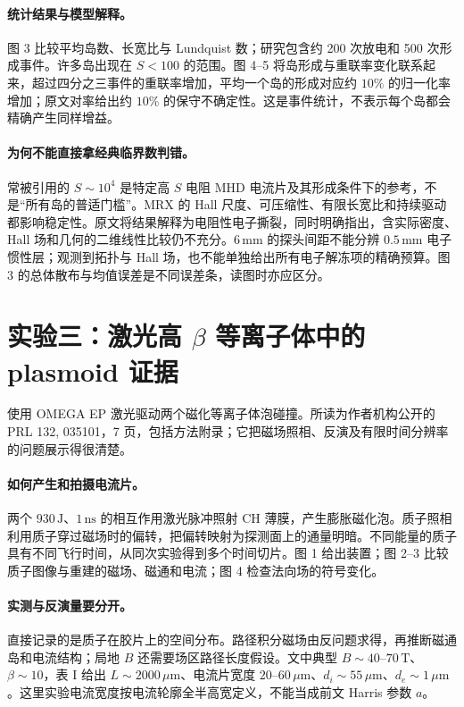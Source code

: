 \paragraph{统计结果与模型解释。}
图 3 比较平均岛数、长宽比与 Lundquist 数；研究包含约 200 次放电和 500 次形成事件。许多岛出现在 $S<100$ 的范围。图 4--5 将岛形成与重联率变化联系起来，超过四分之三事件的重联率增加，平均一个岛的形成对应约 $10\%$ 的归一化率增加；原文对率给出约 $10\%$ 的保守不确定性。这是事件统计，不表示每个岛都会精确产生同样增益。\citep{TMJaraAlmonte2016}

\paragraph{为何不能直接拿经典临界数判错。}
常被引用的 $S\sim10^4$ 是特定高 $S$ 电阻 MHD 电流片及其形成条件下的参考，不是“所有岛的普适门槛”。MRX 的 Hall 尺度、可压缩性、有限长宽比和持续驱动都影响稳定性。原文将结果解释为电阻性电子撕裂，同时明确指出，含实际密度、Hall 场和几何的二维线性比较仍不充分。$6\,\mathrm{mm}$ 的探头间距不能分辨 $0.5\,\mathrm{mm}$ 电子惯性层；观测到拓扑与 Hall 场，也不能单独给出所有电子解冻项的精确预算。图 3 的总体散布与均值误差是不同误差条，读图时亦应区分。\citep{TMJaraAlmonte2016}

\section{实验三：激光高 \texorpdfstring{$\beta$}{beta} 等离子体中的 plasmoid 证据}
\label{tm:sec:laser}

\citet{TMPearcy2024} 使用 OMEGA EP 激光驱动两个磁化等离子体泡碰撞。所读为作者机构公开的 PRL 132, 035101，7 页，包括方法附录；它把磁场照相、反演及有限时间分辨率的问题展示得很清楚。

\paragraph{如何产生和拍摄电流片。}
两个 $930\,\mathrm J$、$1\,\mathrm{ns}$ 的相互作用激光脉冲照射 CH 薄膜，产生膨胀磁化泡。质子照相利用质子穿过磁场时的偏转，把偏转映射为探测面上的通量明暗。不同能量的质子具有不同飞行时间，从同次实验得到多个时间切片。图 1 给出装置；图 2--3 比较质子图像与重建的磁场、磁通和电流；图 4 检查法向场的符号变化。

\paragraph{实测与反演量要分开。}
直接记录的是质子在胶片上的空间分布。路径积分磁场由反问题求得，再推断磁通岛和电流结构；局地 $B$ 还需要场区路径长度假设。文中典型 $B\sim40$--$70\,\mathrm T$、$\beta\sim10$，表 I 给出 $L\sim2000\,\mu\mathrm m$、电流片宽度 $20$--$60\,\mu\mathrm m$、$d_i\sim55\,\mu\mathrm m$、$d_e\sim1\,\mu\mathrm m$。这里实验电流宽度按电流轮廓全半高宽定义，不能当成前文 Harris 参数 $a$。

